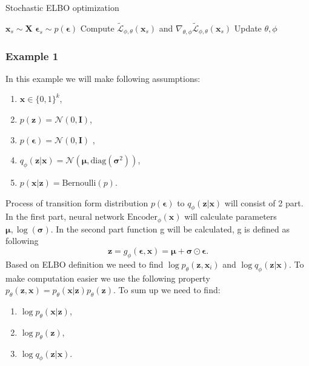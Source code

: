\documentclass[10pt]{article}
\begin{document}
\begin{algorithm}[H]
\caption{Stochastic ELBO optimization}
\begin{algorithmic}
    \State $ \textbf{x}_{s} \sim \textbf{X}$ 
    \State $ \bm{\epsilon}_{s} \sim p(\bm{\epsilon})$ 
    \State Compute $ \tilde{ \mathcal{L}}_{\phi, \theta}(\textbf{x}_{s} )$ and 
    $ \nabla_{\theta, \phi} \tilde{ \mathcal{L}}_{\phi, \theta}(\textbf{x}_{s} )$
    \State Update $\theta, \phi$
\EndWhile

\end{algorithmic} 
\label{al:elbo_train}
\end{algorithm}
\subsubsection{Example 1}
In this example we will make following assumptions:
\begin{enumerate}
    \item $\textbf{x} \in \{0,1\}^{k}$,
    \item $p(\textbf{z}) = \mathcal{N}(0, \mathbf{I} )$,
    \item $p(\bm{\epsilon}) = \mathcal{N}(0, \mathbf{I} )$ ,
    \item $ q_{\phi }(\textbf{z}|\textbf{x}) =
    \mathcal{N}(\bm{\mu}, \text{diag}(\bm{\sigma}^{2}) )$,
    \item $p(\textbf{x} | \textbf{z}) = \text{Bernoulli}(p)$.
\end{enumerate} 
Process of transition form distribution $p(\bm{\epsilon})$ to $ q_{\phi }(\textbf{z}|\textbf{x}) $ will consist of 2 part. In the first part, neural network $\text{Encoder}_{\phi}(\textbf{x})$ will calculate parameters $\bm{\mu}, \log(\bm{\sigma})$. In the second part function g will be calculated, g is defined as following 
\begin{equation}
    \textbf{z} = g_{\phi} (\bm{\epsilon}, \textbf{x}) = \bm{\mu} + \bm{\sigma} \odot \bm{\epsilon}.
\end{equation}
Based on ELBO definition we need to find 
$\log p_{\theta }(\textbf{z}, \textbf{x}_{i})$ and $\log q_{\phi }(\textbf{z}|\textbf{x})$. To make computation easier we use the following property $p_{\theta }(\textbf{z}, \textbf{x})= p_{\theta }(\textbf{x}|\textbf{z})p_{\theta }(\textbf{z}) $. 
To sum up we need to find: \\
\begin{enumerate}
    \item $\log p_{\theta }(\textbf{x}|\textbf{z})$,
    \item $  \log p_{\theta }(\textbf{z})$,
    \item $\log q_{\phi }(\textbf{z}|\textbf{x})$.
\end{enumerate}
\end{document}
